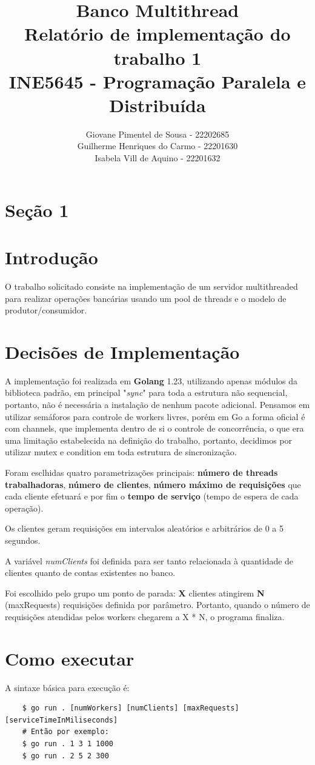 \documentclass{article}
\title{
	Banco Multithread\\
	\large Relatório de implementação do trabalho 1\\INE5645 - Programação Paralela e Distribuída
}
\author{Giovane Pimentel de Sousa - 22202685\\
		Guilherme Henriques do Carmo - 22201630\\
		Isabela Vill de Aquino - 22201632
}
\begin{document}
\maketitle
\section*{Seção 1}
\section*{Introdução}
O trabalho solicitado consiste na implementação de um servidor multithreaded para realizar operações bancárias usando um pool de threads e o modelo de produtor/consumidor.

\section*{Decisões de Implementação}
A implementação foi realizada em \textbf{Golang} 1.23, utilizando apenas módulos da biblioteca padrão, em principal "\textit{sync}"
para toda a estrutura não sequencial, portanto, não é necessária a instalação de nenhum pacote adicional. Pensamos
em utilizar semáforos para controle de workers livres, porém em Go a forma oficial é com channels, que implementa
dentro de si o controle de concorrência, o que era uma limitação estabelecida na definição do trabalho, portanto,
decidimos por utilizar mutex e condition em toda estrutura de sincronização.

Foram esclhidas quatro parametrizações principais:
\textbf{número de threads trabalhadoras}, \textbf{número de clientes}, \textbf{número máximo de requisições}
que cada cliente efetuará e por fim o \textbf{tempo de serviço} (tempo de espera de cada operação).

Os clientes geram requisições em intervalos aleatórios e arbitrários de 0 a 5 segundos.

A variável \textit{numClients} foi definida para ser tanto relacionada à quantidade de clientes quanto de contas existentes no banco.

Foi escolhido pelo grupo um ponto de parada: \textbf{X} clientes atingirem \textbf{N} (maxRequests) requisições definida por parâmetro.
Portanto, quando o número de requisições atendidas pelos workers chegarem a X * N, o programa finaliza.

\section*{Como executar}
A sintaxe básica para execução é:
\begin{lstlisting}
	$ go run . [numWorkers] [numClients] [maxRequests] [serviceTimeInMiliseconds]
	# Então por exemplo:	
	$ go run . 1 3 1 1000
	$ go run . 2 5 2 300
\end{lstlisting}
\end{document}
